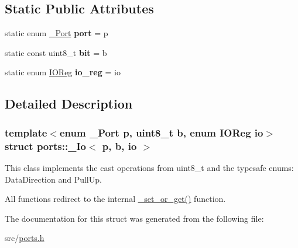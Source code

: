 \subsection*{Static Public Attributes}
\begin{DoxyCompactItemize}
\item 
\hypertarget{structports_1_1__Io_adad70155dd6893a33058c00b39a61868}{}\label{structports_1_1__Io_adad70155dd6893a33058c00b39a61868} 
static enum \hyperlink{namespaceports_a9949317f344930bd6ad1097e80c97b67}{\+\_\+\+Port} {\bfseries port} = p
\item 
\hypertarget{structports_1_1__Io_ab6ad4e5dabbb7a274ef5299a9bdb094f}{}\label{structports_1_1__Io_ab6ad4e5dabbb7a274ef5299a9bdb094f} 
static const uint8\+\_\+t {\bfseries bit} = b
\item 
\hypertarget{structports_1_1__Io_acdb506a481ed44079a6fff95374b5852}{}\label{structports_1_1__Io_acdb506a481ed44079a6fff95374b5852} 
static enum \hyperlink{namespaceports_aca1f1af9f1af73e71c6954b7dfb1bfa1}{I\+O\+Reg} {\bfseries io\+\_\+reg} = io
\end{DoxyCompactItemize}


\subsection{Detailed Description}
\subsubsection*{template$<$enum \+\_\+\+Port p, uint8\+\_\+t b, enum I\+O\+Reg io$>$\newline
struct ports\+::\+\_\+\+Io$<$ p, b, io $>$}

This class implements the cast operations from uint8\+\_\+t and the typesafe enums\+: Data\+Direction and Pull\+Up. 

All functions redirect to the internal \hyperlink{namespaceports_aa339a9d178cb414c4cf243450d5887d2}{\+\_\+set\+\_\+or\+\_\+get()} function. 

The documentation for this struct was generated from the following file\+:\begin{DoxyCompactItemize}
\item 
src/\hyperlink{ports_8h}{ports.\+h}\end{DoxyCompactItemize}

